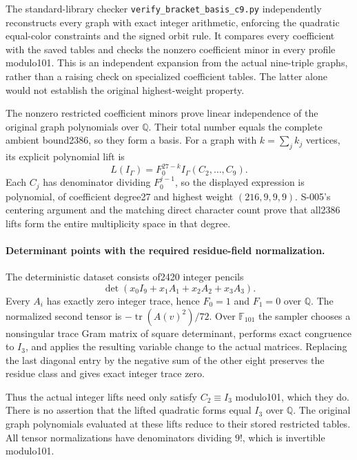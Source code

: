 The standard-library checker \texttt{verify\_bracket\_basis\_c9.py}
independently reconstructs every graph with exact integer arithmetic,
enforcing the quadratic equal-color constraints and the signed orbit
rule.  It compares every coefficient with the saved tables and checks
the nonzero coefficient minor in every profile modulo101.  This is
an independent expansion from the actual nine-triple graphs, rather
than a raising check on specialized coefficient tables.  The latter
alone would not establish the original highest-weight property.

The nonzero restricted coefficient minors prove linear independence
of the original graph polynomials over $\mathbb Q$.  Their total
number equals the complete ambient bound2386, so they form a basis.
For a graph with $k=\sum_j k_j$ vertices, its explicit polynomial
lift is
\[
                   L(I_\Gamma)=F_0^{27-k}I_\Gamma(C_2,\ldots,C_9).
\]
Each $C_j$ has denominator dividing $F_0^{j-1}$, so the displayed
expression is polynomial, of coefficient degree27 and highest weight
$(216,9,9,9)$.  S-005's centering argument and the matching direct
character count prove that all2386 lifts form the entire multiplicity
space in that degree.

\paragraph{Determinant points with the required residue-field normalization.}
The deterministic dataset consists of2420 integer pencils
\[
                      \det(x_0I_9+x_1A_1+x_2A_2+x_3A_3).
\]
Every $A_i$ has exactly zero integer trace, hence $F_0=1$ and
$F_1=0$ over $\mathbb Q$.  The normalized second tensor is
$-\operatorname{tr}(A(v)^2)/72$.  Over $\mathbb F_{101}$ the sampler
chooses a nonsingular trace Gram matrix of square determinant,
performs exact congruence to $I_3$, and applies the resulting variable
change to the actual matrices.  Replacing the last diagonal entry
by the negative sum of the other eight preserves the residue class
and gives exact integer trace zero.

Thus the actual integer lifts need only satisfy $C_2\equiv I_3$
modulo101, which they do.  There is no assertion that the lifted
quadratic forms equal $I_3$ over $\mathbb Q$.  The original graph
polynomials evaluated at these lifts reduce to their stored restricted
tables.  All tensor normalizations have denominators dividing $9!$,
which is invertible modulo101.

